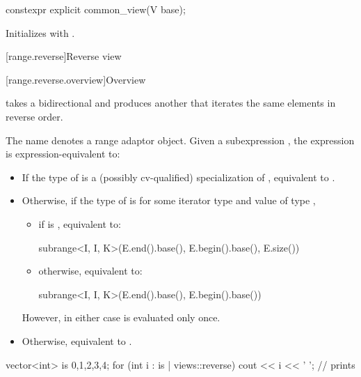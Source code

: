 %
\begin{itemdecl}
constexpr explicit common_view(V base);
\end{itemdecl}

\begin{itemdescr}
\pnum
\effects
Initializes  with .
\end{itemdescr}

[range.reverse]{Reverse view}

[range.reverse.overview]{Overview}

\pnum
{} takes a bidirectional  and produces
another  that iterates the same elements in reverse order.

\pnum
{}%
The name  denotes a
range adaptor object.
Given a subexpression , the expression
 is expression-equivalent to:
\begin{itemize}
\item
  If the type of  is
  a (possibly cv-qualified) specialization of ,
  equivalent to .
\item
  Otherwise, if the type of  is \cv{} 
  for some iterator type  and
  value  of type ,
  \begin{itemize}
  \item
    if  is , equivalent to:
\begin{codeblock}
subrange<I, I, K>(E.end().base(), E.begin().base(), E.size())
\end{codeblock}
  \item
    otherwise, equivalent to:
\begin{codeblock}
subrange<I, I, K>(E.end().base(), E.begin().base())
\end{codeblock}
  \end{itemize}
  However, in either case  is evaluated only once.
\item
  Otherwise, equivalent to .
\end{itemize}

\pnum
\begin{example}
\begin{codeblock}
vector<int> is {0,1,2,3,4};
for (int i : is | views::reverse)
  cout << i << ' '; // prints 
\end{codeblock}
\end{example}

